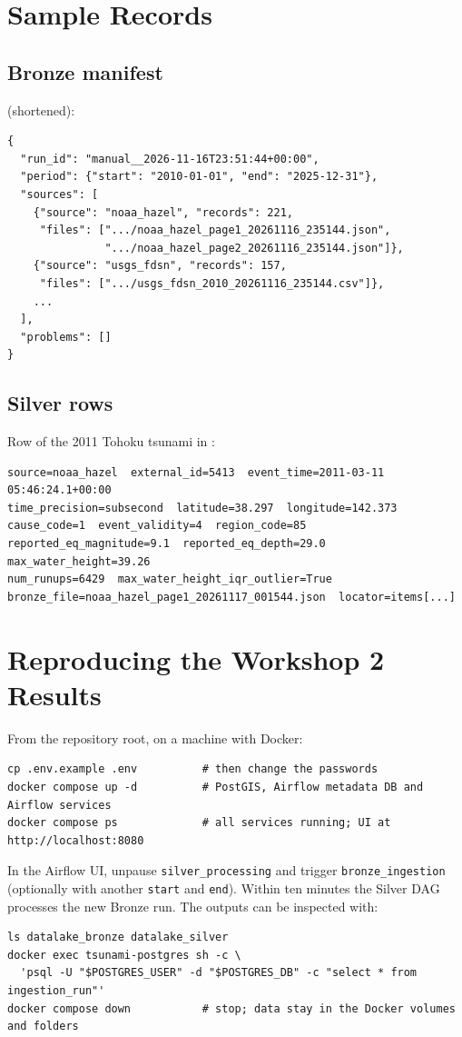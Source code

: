 \documentclass[a4paper,11pt,oneside]{book}
\begin{document}
    \begin{appendices}
\chapter{Sample Records}
\label{app:samples}
\section{Bronze manifest}
 (shortened):
\begin{lstlisting}
{
  "run_id": "manual__2026-11-16T23:51:44+00:00",
  "period": {"start": "2010-01-01", "end": "2025-12-31"},
  "sources": [
    {"source": "noaa_hazel", "records": 221,
     "files": [".../noaa_hazel_page1_20261116_235144.json",
               ".../noaa_hazel_page2_20261116_235144.json"]},
    {"source": "usgs_fdsn", "records": 157,
     "files": [".../usgs_fdsn_2010_20261116_235144.csv"]},
    ...
  ],
  "problems": []
}
\end{lstlisting}

\section{Silver rows}
Row of the 2011 Tohoku tsunami in :
\begin{lstlisting}
source=noaa_hazel  external_id=5413  event_time=2011-03-11 05:46:24.1+00:00
time_precision=subsecond  latitude=38.297  longitude=142.373
cause_code=1  event_validity=4  region_code=85
reported_eq_magnitude=9.1  reported_eq_depth=29.0  max_water_height=39.26
num_runups=6429  max_water_height_iqr_outlier=True
bronze_file=noaa_hazel_page1_20261117_001544.json  locator=items[...]
\end{lstlisting}

\chapter{Reproducing the Workshop 2 Results}
\label{app:reproduce}
From the repository root, on a machine with Docker:
\begin{lstlisting}
cp .env.example .env          # then change the passwords
docker compose up -d          # PostGIS, Airflow metadata DB and Airflow services
docker compose ps             # all services running; UI at http://localhost:8080
\end{lstlisting}
In the Airflow UI, unpause \texttt{silver\_processing} and trigger \texttt{bronze\_ingestion} (optionally with another \texttt{start} and \texttt{end}).
Within ten minutes the Silver DAG processes the new Bronze run. The outputs can be inspected with:
\begin{lstlisting}
ls datalake_bronze datalake_silver
docker exec tsunami-postgres sh -c \
  'psql -U "$POSTGRES_USER" -d "$POSTGRES_DB" -c "select * from ingestion_run"'
docker compose down           # stop; data stay in the Docker volumes and folders
\end{lstlisting}
    \end{appendices}
\end{document}
